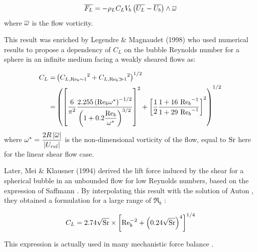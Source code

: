 \begin{equation}
\overline{F_{L}} = - \rho_{L} C_{L} V_{b} \left( \overline{U_{L}} - \overline{U_{b}} \right) \wedge \overline{\omega} 
\end{equation} 
where $\overline{\omega}$ is the flow vorticity.

\npar
This result was enriched by Legendre \& Magnaudet (1998) \cite{legendre_lift_1998} who used numerical results to propose a dependency of $C_{L}$ on the bubble Reynolds number for a sphere in an infinite medium facing a weakly sheared flows as:

\begin{align}
C_{L} =&\left(  {C_{L,\mathrm{Re}_{b} \sim 1}}^{2} + {C_{L,\mathrm{Re}_{b} \gg 1}}^{2}  \right)^{1/2}\\
 =&\left(  \left[ \frac{6}{\pi^{2}} \frac{2.255 \left( \mathrm{Re}_{b}\omega^{*} \right)^{-1/2}}{ \left( 1+0.2\dfrac{\mathrm{Re}_{b}}{\omega^{*}} \right)^{3/2} } \right]^{2} + \left[  \frac{1}{2} \frac{1+16\ {\mathrm{Re}_{b}}^{-1}}{1+29\ {\mathrm{Re}_{b}}^{-1}}  \right]^{2}  \right)^{1/2}
\end{align} 
where $\omega^{*} = \dfrac{2R\left| \overline{\omega} \right|}{\left| U_{rel} \right|}$ is the non-dimensional vorticity of the flow, equal to $\mathrm{Sr}$ here for the linear shear flow case.
%


\npar

Later, Mei \& Klausner (1994) \cite{mei_shear_1994} derived the lift force induced by the shear for a spherical bubble in an unbounded flow for low Reynolds numbers, based on the expression of Saffmann \cite{saffman_lift_1965}. By interpolating this result with the solution of Auton \cite{auton_lift_1987}, they obtained a formulation for a large range of $\Re_{b}$ :

\begin{equation}
C_{L} = 2.74 \sqrt{\mathrm{Sr}} \times \left[ \mathrm{Re}_{b}^{-2} + \left( 0.24\sqrt{\mathrm{Sr}} \right)^{4} \right]^{1/4}
\label{eq:lift_mei}
\end{equation}

This expression is actually used in many mechanistic force balance \cite{klausner_vapor_1993, chen_prediction_2012, sugrue_modified_2016, ren_development_2020}.


\npar

